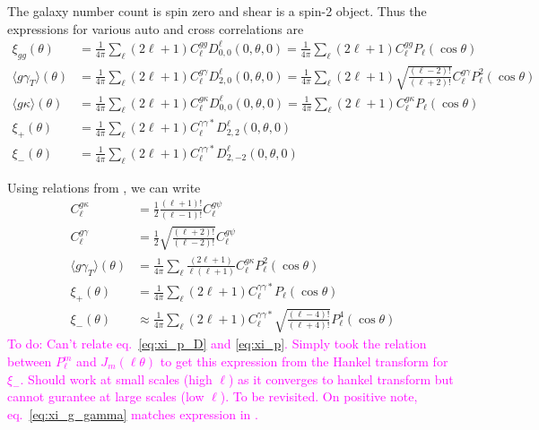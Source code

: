 \documentclass[\docopts]{\docclass}
\newcommand{\todo}[1]{\textcolor{magenta}{To do: #1}}
\begin{document}
The galaxy number count is spin zero and shear is a spin-2 object. Thus the expressions for various auto and cross correlations are
\begin{align}
  \xi_{gg}(\theta)&=\frac{1}{4\pi}\sum_{\ell}{(2\ell+1)}C_{\ell}^{gg}D^{\ell}_{0,0}(0,\theta,0)=
  \frac{1}{4\pi}\sum_{\ell}{(2\ell+1)}C_{\ell}^{gg}P_{\ell}(\cos\theta)\label{eq:xi_gg_D}\\
  \langle g\gamma_T\rangle(\theta)&=
  \frac{1}{4\pi}\sum_{\ell}{(2\ell+1)}C_{\ell}^{g\gamma}D^{\ell}_{2,0}(0,\theta,0)=
  \frac{1}{4\pi}\sum_{\ell}(2\ell+1)\sqrt{\frac{(\ell-2)!}{(\ell+2)!}}C_{\ell}^{g\gamma}
  P_{\ell}^2(\cos\theta)\label{eq:xi_g_gamma_D}\\
  \langle g\kappa\rangle(\theta)&=
  \frac{1}{4\pi}\sum_{\ell}{(2\ell+1)}C_{\ell}^{g\kappa}D^{\ell}_{0,0}(0,\theta,0)=
  \frac{1}{4\pi}\sum_{\ell}(2\ell+1)C_{\ell}^{g\kappa}
  P_{\ell}(\cos\theta)\label{eq:xi_g_kappa_D}\\
  \xi_+(\theta)&=\frac{1}{4\pi}\sum_{\ell}{(2\ell+1)}C_{\ell}^{\gamma\gamma*}
  D^{\ell}_{2,2}(0,\theta,0)\label{eq:xi_p_D}\\
  \xi_-(\theta)&=\frac{1}{4\pi}\sum_{\ell}{(2\ell+1)}C_{\ell}^{\gamma\gamma*}
  D^{\ell}_{2,-2}(0,\theta,0)
  \label{eq:xi_m_D}
\end{align}

Using relations from \cite{Kilbinger2017}, we can write
\begin{align}
  C_{\ell}^{g\kappa}&={\frac{1}{2}\frac{(\ell+1)!}{(\ell-1)!}}C_{\ell}^{g\psi}\\
  C_{\ell}^{g\gamma}&=\frac{1}{2}\sqrt{\frac{(\ell+2)!}{(\ell-2)!}}C_{\ell}^{g\psi}
  \\ \langle g\gamma_T\rangle(\theta)&
  =\frac{1}{4\pi}\sum_{\ell}\frac{(2\ell+1)}{\ell(\ell+1)}C_{\ell}^{g\kappa}P_{\ell}^2(\cos\theta)
  \label{eq:xi_g_gamma}\\
  \xi_+(\theta)&=\frac{1}{4\pi}\sum_{\ell}{(2\ell+1)}C_{\ell}^{\gamma\gamma*}
  P_{\ell}(\cos\theta)\label{eq:xi_p}\\
  \xi_-(\theta)&\approx\frac{1}{4\pi}\sum_{\ell}{(2\ell+1)}
  C_{\ell}^{\gamma\gamma*}\sqrt{\frac{(\ell-4)!}{(\ell+4)!}}
  P_{\ell}^4(\cos\theta)\label{eq:xi_m}
\end{align}
\todo{Can't relate eq.~\ref{eq:xi_p_D} and \ref{eq:xi_p}.
Simply took the relation between $P_\ell^m$ and $J_m(\ell \theta)$ to get this expression
from the Hankel transform for $\xi_-$. Should work at small scales (high $\ell$) as it converges to
hankel transform but cannot gurantee at large scales (low $\ell$). To be revisited.
On positive note, eq.~\ref{eq:xi_g_gamma} matches expression in \cite{Putter2010}.}
\end{document}
